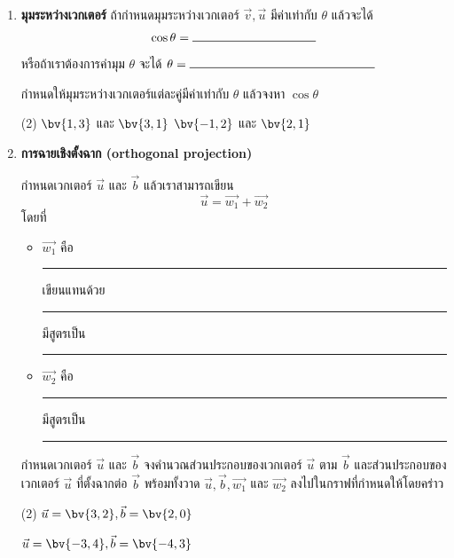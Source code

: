 \begin{enumerate}
\item \textbf{มุมระหว่างเวกเตอร์} 
ถ้ากำหนดมุมระหว่างเวกเตอร์ $\vec{v}, \vec{u}$ มีค่าเท่ากับ $\theta$ แล้วจะได้
\[ \cos \theta =  \rule{100pt}{.5pt}\]
หรือถ้าเราต้องการค่ามุม $\theta$ จะได้ $\theta = \rule{150pt}{.5pt}$

กำหนดให้มุมระหว่างเวกเตอร์แต่ละคู่มีค่าเท่ากับ $\theta$ แล้วจงหา $\cos\theta$
\begin{tasks}[after-item-skip = 80pt, after-skip = 80pt](2)
\task $\bv{1,3}$ และ $\bv{3,1}$
\task $\bv{-1, 2}$ และ $\bv{2, 1}$
\end{tasks}

\item \textbf{การฉายเชิงตั้งฉาก (orthogonal projection)} 

กำหนดเวกเตอร์ $\vec{u}$ และ $\vec{b}$ แล้วเราสามารถเขียน
\[ \vec{u} = \vec{w_1} + \vec{w_2}\]
โดยที่ 
\begin{itemize}
\item $\vec{w_1}$ คือ \rule{100pt}{.5pt} เขียนแทนด้วย \rule{100pt}{.5pt} มีสูตรเป็น \rule{100pt}{.5pt}
\item  $\vec{w_2}$ คือ \rule{100pt}{.5pt} มีสูตรเป็น \rule{100pt}{.5pt}
\end{itemize}

กำหนดเวกเตอร์ $\vec{u}$ และ $\vec{b}$ จงคำนวณส่วนประกอบของเวกเตอร์ $\vec{u}$ ตาม $\vec{b}$ และส่วนประกอบของเวกเตอร์ $\vec{u}$ ที่ตั้งฉากต่อ $\vec{b}$ พร้อมทั้งวาด $\vec{u}, \vec{b}, \vec{w_1}$ และ $\vec{w_2}$ ลงไปในกราฟที่กำหนดให้โดยคร่าว

\begin{tasks}(2)
\task $\vec{u} = \bv{3,2}, \vec{b} = \bv{2,0} $


\task $\vec{u} = \bv{-3,4}, \vec{b} = \bv{-4,3} $

\end{tasks}


\end{enumerate}
